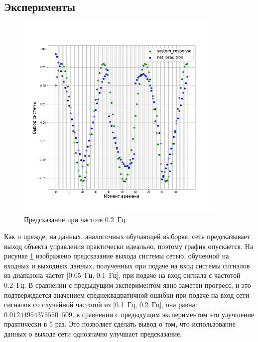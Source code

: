 \documentclass[12pt, oneside]{extbook}
\begin{document}
\begin{flushleft}
\section{Эксперименты}
\par
\begin{figure}[h]
\centering
\includegraphics[width=0.9\textwidth]{rnn_2_prediction_shifted}
\caption{Предсказание при частоте 0.2~Гц.}
\label{fig:lstm_2_prediction_shifted}
\end{figure}
Как и прежде, на данных, аналогичных обучающей выборке, сеть предсказывает выход объекта управления практически идеально, поэтому график опускается. На рисунке \ref{fig:lstm_2_prediction_shifted} изображено предсказание выхода системы сетью, обученной на входных и выходных данных, полученных при подаче на вход системы сигналов из диапазона частот [0.05~Гц, 0.1~Гц], при подаче на вход сигнала с частотой 0.2~Гц. В сравнении с предыдущим экспериментом явно заметен прогресс, и это подтверждается значением среднеквадратичной ошибки при подаче на вход сети сигналов со случайной частотой из [0.1~Гц, 0.2~Гц], она равна: $0.012449543755501509$, в сравнении с предыдущим экспериментом это улучшение практически в 5 раз. Это позволяет сделать вывод о том, что использование данных о выходе сети однозначно улучшает предсказание.
\par
\begin{figure}[h]
\centering

\end{figure}
\end{flushleft}
\end{document}
